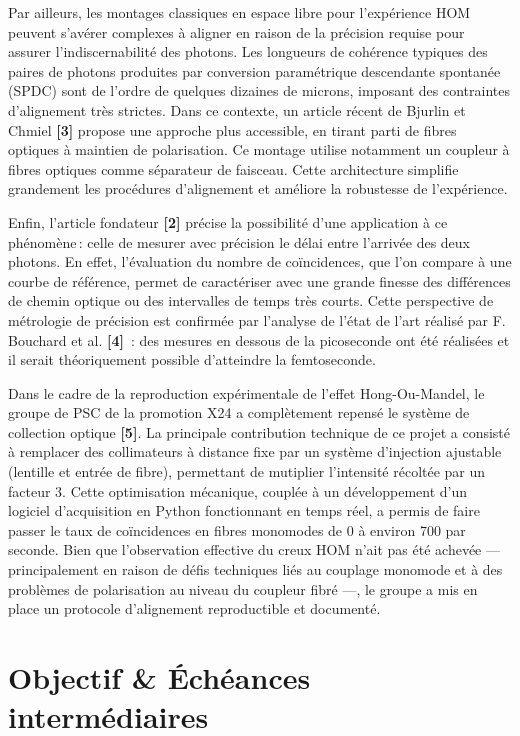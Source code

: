 \documentclass[a4paper, 12pt]{article}
\begin{document}
Par ailleurs, les montages classiques en espace libre pour l'expérience HOM peuvent s'avérer complexes à aligner en raison de la précision requise pour assurer l'indiscernabilité des photons. Les longueurs de cohérence typiques des paires de photons produites par conversion paramétrique descendante spontanée (SPDC) sont de l'ordre de quelques dizaines de microns, imposant des contraintes d'alignement très strictes. Dans ce contexte, un article récent de Bjurlin et Chmiel \textbf{[3]} propose une approche plus accessible, en tirant parti de fibres optiques à maintien de polarisation. Ce montage utilise notamment un coupleur à fibres optiques comme séparateur de faisceau. Cette architecture simplifie grandement les procédures d'alignement et améliore la robustesse de l'expérience.

Enfin, l’article fondateur \textbf{[2]} précise la possibilité d'une application à ce phénomène : celle de mesurer avec précision le délai entre l’arrivée des deux photons. En effet, l’évaluation du nombre de coïncidences, que l’on compare à une courbe de référence, permet de caractériser avec une grande finesse des différences de chemin optique ou des intervalles de temps très courts. Cette perspective de métrologie de précision est confirmée par l’analyse de l’état de l’art réalisé par F. Bouchard et al. \textbf{[4]} : des mesures en dessous de la picoseconde ont été réalisées et il serait théoriquement possible d’atteindre la femtoseconde.

Dans le cadre de la reproduction expérimentale de l'effet Hong-Ou-Mandel, le groupe de PSC de la promotion X24 a complètement repensé le système de collection optique \textbf{[5]}. La principale contribution technique de ce projet a consisté à remplacer des collimateurs à distance fixe par un système d'injection ajustable (lentille et entrée de fibre), permettant de mutiplier l'intensité récoltée par un facteur 3. Cette optimisation mécanique, couplée à un développement d'un logiciel d'acquisition en Python fonctionnant en temps réel, a permis de faire passer le taux de coïncidences en fibres monomodes de 0 à environ 700 par seconde. Bien que l'observation effective du creux HOM n'ait pas été achevée — principalement en raison de défis techniques liés au couplage monomode et à des problèmes de polarisation au niveau du coupleur fibré —, le groupe a mis en place un protocole d'alignement reproductible et documenté.

\clearpage
\section{Objectif \& Échéances intermédiaires}
\end{document}
